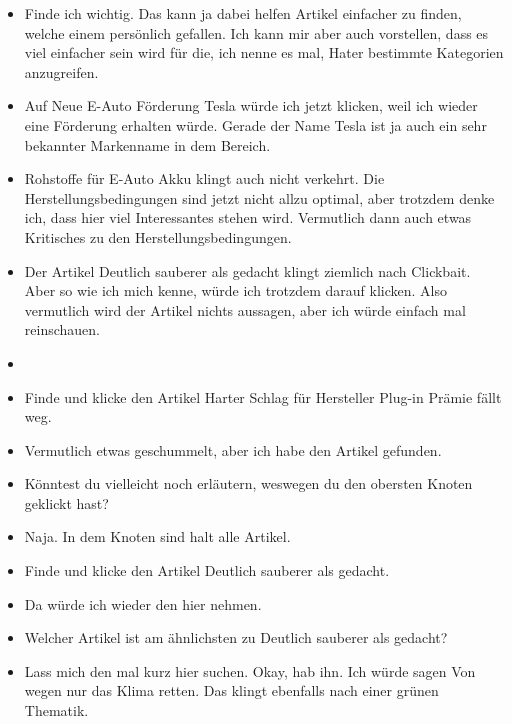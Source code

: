 {\begin{itemize}[]
        \item {} Finde ich wichtig.
              Das kann ja dabei helfen Artikel einfacher zu finden, welche einem persönlich gefallen.
              Ich kann mir aber auch vorstellen, dass es viel einfacher sein wird für die, ich nenne es mal, Hater bestimmte Kategorien anzugreifen.
        \item {} Auf \flqq Neue E-Auto Förderung Tesla\frqq{} würde ich jetzt klicken, weil ich wieder eine Förderung erhalten würde.
              Gerade der Name Tesla ist ja auch ein sehr bekannter Markenname in dem Bereich.
        \item {} \flqq Rohstoffe für E-Auto Akku\frqq{} klingt auch nicht verkehrt.
              Die Herstellungsbedingungen sind jetzt nicht allzu optimal, aber trotzdem denke ich, dass hier viel Interessantes stehen wird.
              Vermutlich dann auch etwas Kritisches zu den Herstellungsbedingungen.
        \item {} Der Artikel \flqq Deutlich sauberer als gedacht\frqq{} klingt ziemlich nach Clickbait.
              Aber so wie ich mich kenne, würde ich trotzdem darauf klicken.
              Also vermutlich wird der Artikel nichts aussagen, aber ich würde einfach mal reinschauen.
        \item {}
        \item {} Finde und klicke den Artikel \flqq Harter Schlag für Hersteller Plug-in Prämie fällt weg\frqq{}.
        \item {} Vermutlich etwas geschummelt, aber ich habe den Artikel gefunden.
        \item {} Könntest du vielleicht noch erläutern, weswegen du den obersten Knoten geklickt hast?
        \item {} Naja. In dem Knoten sind halt alle Artikel.
        \item {} Finde und klicke den Artikel \flqq Deutlich sauberer als gedacht\frqq{}.
        \item {} Da würde ich wieder den hier nehmen.
        \item {} Welcher Artikel ist am ähnlichsten zu \flqq Deutlich sauberer als gedacht\frqq{}?
        \item {} Lass mich den mal kurz hier suchen.
              Okay, hab ihn.
              Ich würde sagen \flqq Von wegen nur das Klima retten\frqq{}.
              Das klingt ebenfalls nach einer grünen Thematik.

\end{itemize}}
